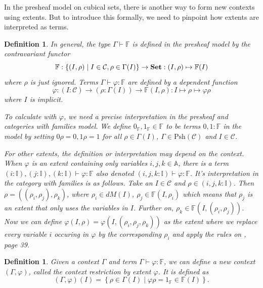 \documentclass[12pt,a4paper,twoside,xetex,draft]{book}
\newcommand{\keyword}[1]{\emph{#1}\index{#1}}
\newtheorem{definition}[theorem]{Definition}
\newcommand{\Psh}[1]{\text{Psh}\left(#1\right)}
\begin{document}
In the presheaf model on cubical sets, there is another way to form new contexts using extents. But to introduce this formally, we need to pinpoint how extents are interpreted as terms.

\begin{definition}
In general, the type $\Gamma \vdash \mathbb{F}$ is defined in the presheaf model by the contravariant functor $$\mathbb{F} : \left\{ (I, \rho) \mid  I \in \mathcal{C},  \rho \in \Gamma (I) \right\} \rightarrow \text{\textbf{Set}}: (I, \rho) \mapsto \mathbb{F}(I)$$ where $\rho$ is just ignored. Terms $\Gamma \vdash \varphi : \mathbb{F}$ are defined by a dependent function $$\varphi : (I : \mathcal{C}) \rightarrow (\rho : \Gamma (I)) \rightarrow  \mathbb{F}(I,\rho): I \mapsto \rho \mapsto \varphi \rho $$ where $I$ is implicit.

To calculate with $\varphi$, we need a precise interpretation in the presheaf and categeries with families model. We define $ 0_{\mathbb{F}}, 1_{\mathbb{F}} \in \mathbb{F}$ to be terms $0,1 : \mathbb{F}$ in the model by setting \(0 \rho = 0, 1 \rho = 1\) for all $\rho \in \Gamma (I)$, $\Gamma \in \Psh{\mathcal{C}}$ and $I \in \mathcal{C}$.  

For other extents, the definition or interpretation may depend on the context. When $\varphi$ is an extent containing only variables $i,j,k \in \mathbb{A}$, there is a term $(i: \mathbb{I}), (j: \mathbb{I}), (k: \mathbb{I}) \vdash \varphi : \mathbb{F}$ also denoted $(i,j,k: \mathbb{I}) \vdash \varphi : \mathbb{F}$. It's interpretation in the category with families is as follows. Take an $I \in \mathcal{C}$ and  $\rho \in (i,j,k: \mathbb{I})$. Then $\rho = ((\rho_i, \rho_j), \rho_k)$, where $\rho_i \in dM(I)$, $\rho_j \in \mathbb{F}(I,\rho_i)$ which means that $\rho_j$ is an extent that only uses the variables in $I$. Further on, $\rho_k \in \mathbb{F}(I, (\rho_i, \rho_j))$. Now we can define $\varphi(I,\rho)=\varphi(I,(\rho_i,\rho_j,\rho_k))$ as the extent where we replace every variable $i$ occuring in $\varphi$ by the corresponding $\rho_i$ and apply the rules on \cite{Orton2019}, page 39.
\end{definition}



\begin{definition}\label{contextrestriction}
Given a context $\Gamma$ and term $\Gamma \vdash \varphi : \mathbb{F}$, we can define a new context $(\Gamma , \varphi)$, called the \keyword{context restriction by extent $\varphi$}. It is defined as  $$(\Gamma , \varphi)(I) = \left\{ \rho \in \Gamma (I) \mid \varphi \rho = 1_{\mathbb{F}} \in \mathbb{F}(I) \right \} .$$
\end{definition}
 
\end{document}
